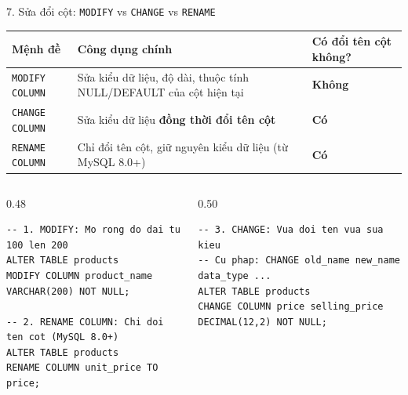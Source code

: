 \documentclass[aspectratio=169,11pt]{beamer}
\begin{document}
\begin{frame}[fragile]{7. Sửa đổi cột: \texttt{MODIFY} vs \texttt{CHANGE} vs \texttt{RENAME}}
\begin{table}
\centering
\scriptsize
\begin{tabularx}{\textwidth}{lXl}
\toprule
\textbf{Mệnh đề} & \textbf{Công dụng chính} & \textbf{Có đổi tên cột không?} \\
\midrule
\texttt{MODIFY COLUMN} & Sửa kiểu dữ liệu, độ dài, thuộc tính NULL/DEFAULT của cột hiện tại & \textbf{Không} \\
\texttt{CHANGE COLUMN} & Sửa kiểu dữ liệu \textbf{đồng thời đổi tên cột} & \textbf{Có} \\
\texttt{RENAME COLUMN} & Chỉ đổi tên cột, giữ nguyên kiểu dữ liệu (từ MySQL 8.0+) & \textbf{Có} \\
\bottomrule
\end{tabularx}
\end{table}

\begin{columns}[t]
  \begin{column}{0.48\textwidth}
\begin{lstlisting}
-- 1. MODIFY: Mo rong do dai tu 100 len 200
ALTER TABLE products
MODIFY COLUMN product_name VARCHAR(200) NOT NULL;

-- 2. RENAME COLUMN: Chi doi ten cot (MySQL 8.0+)
ALTER TABLE products
RENAME COLUMN unit_price TO price;
\end{lstlisting}
  \end{column}
  \begin{column}{0.50\textwidth}
\begin{lstlisting}
-- 3. CHANGE: Vua doi ten vua sua kieu
-- Cu phap: CHANGE old_name new_name data_type ...
ALTER TABLE products
CHANGE COLUMN price selling_price DECIMAL(12,2) NOT NULL;
\end{lstlisting}
  \end{column}
\end{columns}
\end{frame}
\end{document}
